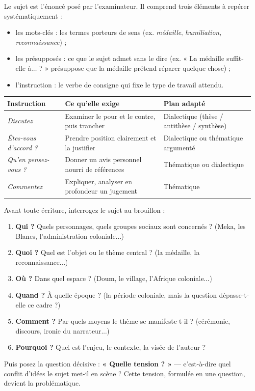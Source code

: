 \documentclass[11pt]{article}
\newcommand{\cle}[1]{{\popxbold\color{popdark}#1}}
\begin{document}
\begin{definition}
Le \cle{sujet} est l'énoncé posé par l'examinateur. Il comprend trois éléments à repérer systématiquement :
\begin{itemize}
\item les \cle{mots-clés} : les termes porteurs de sens (ex. \emph{médaille}, \emph{humiliation}, \emph{reconnaissance}) ;
\item les \cle{présupposés} : ce que le sujet admet sans le dire (ex. « La médaille suffit-elle à... ? » présuppose que la médaille prétend réparer quelque chose) ;
\item l'\cle{instruction} : le verbe de consigne qui fixe le type de travail attendu.
\end{itemize}
\end{definition}

\begin{center}
\begin{tabularx}{\linewidth}{|l|X|X|}\hline
\rowcolor{popblueL} \textbf{Instruction} & \textbf{Ce qu'elle exige} & \textbf{Plan adapté} \\ \hline
\emph{Discutez} & Examiner le pour et le contre, puis trancher & Dialectique (thèse / antithèse / synthèse) \\ \hline
\emph{Êtes-vous d'accord ?} & Prendre position clairement et la justifier & Dialectique ou thématique argumenté \\ \hline
\emph{Qu'en pensez-vous ?} & Donner un avis personnel nourri de références & Thématique ou dialectique \\ \hline
\emph{Commentez} & Expliquer, analyser en profondeur un jugement & Thématique \\ \hline
\end{tabularx}
\end{center}

\begin{methode}
Avant toute écriture, interrogez le sujet au brouillon :
\begin{enumerate}
\item \textbf{Qui ?} Quels personnages, quels groupes sociaux sont concernés ? (Meka, les Blancs, l'administration coloniale...)
\item \textbf{Quoi ?} Quel est l'objet ou le thème central ? (la médaille, la reconnaissance...)
\item \textbf{Où ?} Dans quel espace ? (Doum, le village, l'Afrique coloniale...)
\item \textbf{Quand ?} À quelle époque ? (la période coloniale, mais la question dépasse-t-elle ce cadre ?)
\item \textbf{Comment ?} Par quels moyens le thème se manifeste-t-il ? (cérémonie, discours, ironie du narrateur...)
\item \textbf{Pourquoi ?} Quel est l'enjeu, le contexte, la visée de l'auteur ?
\end{enumerate}
Puis posez la question décisive : \textbf{« Quelle tension ? »} — c'est-à-dire quel conflit d'idées le sujet met-il en scène ? Cette tension, formulée en une question, devient la \cle{problématique}.
\end{methode}
\end{document}
